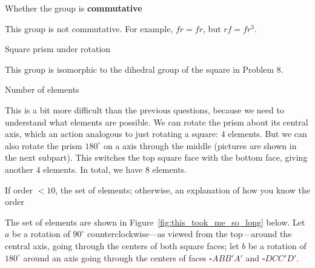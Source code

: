 \documentclass[../gatm_answers.tex]{subfiles}
\begin{document}
\begin{inner_problem}
\item Whether the group is \textbf{commutative}
\end{inner_problem}

This group is not commutative. For example, $fr=fr$, but $rf=fr^3$.

\begin{outer_problem}
\item Square prism under rotation
\end{outer_problem}

This group is isomorphic to the dihedral group of the square in Problem 8.

\begin{inner_problem}[start=1]
\item Number of elements
\end{inner_problem}

This is a bit more difficult than the previous questions, because we need to understand what elements are possible. We can rotate the prism about its central axis, which an action analogous to just rotating a square: $4$ elements. But we can also rotate the prism $180^\circ$ on a axis through the middle (pictures are shown in the next subpart). This switches the top square face with the bottom face, giving another $4$ elements. In total, we have $8$ elements.

\begin{inner_problem}
\item If order $< 10$, the set of elements; otherwise, an explanation of how you know the order
\end{inner_problem}

The set of elements are shown in Figure~\ref{fig:this_took_me_so_long} below. Let $a$ be a rotation of $90^\circ$ counterclockwise---as viewed from the top---around the central axis, going through the centers of both square faces; let $b$ be a rotation of $180^\circ$ around an axis going through the centers of faces $\square ABB'A'$ and $\square DCC'D'$.
\end{document}
